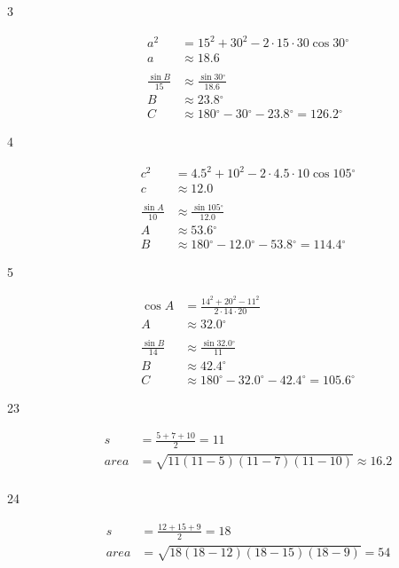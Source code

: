 \documentclass[fleqn,addpoints]{exam}
\newcommand{\degree}{\ensuremath{^\circ}}
\begin{document}
\begin{description}
\item[3]
\begin{align*}
  a^2 &= 15^2 + 30^2 - 2 \cdot 15 \cdot 30 \cos 30 \degree \\
  a &\approx 18.6 \\
  \\
  \frac{\sin B}{15} &\approx \frac{\sin 30 \degree}{18.6} \\
  B &\approx 23.8 \degree
  \\
  C &\approx 180 \degree - 30 \degree - 23.8 \degree = 126.2 \degree
\end{align*}

\item[4]
\begin{align*}
  c^2 &= 4.5^2 + 10^2 - 2 \cdot 4.5 \cdot 10 \cos 105 \degree \\
  c &\approx 12.0 \\
  \\
  \frac{\sin A}{10} &\approx \frac{\sin 105 \degree}{12.0} \\
  A &\approx 53.6 \degree
  \\
  B &\approx 180 \degree - 12.0 \degree - 53.8 \degree = 114.4 \degree
\end{align*}

\item[5]
\begin{align*}
  \cos A &= \frac{14^2 + 20^2 - 11^2}{2 \cdot 14 \cdot 20} \\
  A &\approx 32.0 \degree \\
  \\
  \frac{\sin B}{14} &\approx \frac{\sin 32.0 \degree}{11} \\
  B &\approx 42.4 \degree
  \\
  C &\approx 180 \degree - 32.0 \degree - 42.4 \degree = 105.6 \degree
\end{align*}

\item[23]
\begin{align*}
  s &= \frac{5 + 7 + 10}{2} = 11 \\
  area &= \sqrt{11(11-5)(11-7)(11-10)} \approx 16.2 \\
\end{align*}

\item[24]
\begin{align*}
  s &= \frac{12 + 15 + 9}{2} = 18 \\
  area &= \sqrt{18(18-12)(18-15)(18-9)} = 54 \\
\end{align*}


\end{description}
\end{document}
